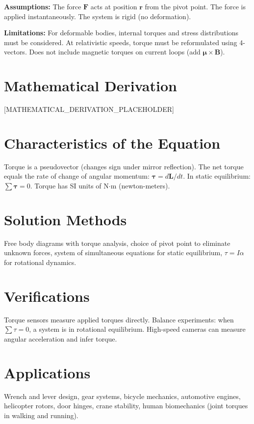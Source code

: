 \documentclass[11pt,openright]{book}
\begin{document}
\textbf{Assumptions:} The force $\mathbf{F}$ acts at position $\mathbf{r}$ from the pivot point. The force is applied instantaneously. The system is rigid (no deformation).


\textbf{Limitations:} For deformable bodies, internal torques and stress distributions must be considered. At relativistic speeds, torque must be reformulated using 4-vectors. Does not include magnetic torques on current loops (add $\boldsymbol{\mu} \times \mathbf{B}$).


\section*{Mathematical Derivation}

[MATHEMATICAL_DERIVATION_PLACEHOLDER]

\section*{Characteristics of the Equation}

Torque is a pseudovector (changes sign under mirror reflection). The net torque equals the rate of change of angular momentum: $\boldsymbol{\tau} = d\mathbf{L}/dt$. In static equilibrium: $\sum \boldsymbol{\tau} = 0$. Torque has SI units of N$\cdot$m (newton-meters).
\section*{Solution Methods}

Free body diagrams with torque analysis, choice of pivot point to eliminate unknown forces, system of simultaneous equations for static equilibrium, $\tau = I\alpha$ for rotational dynamics.
\section*{Verifications}

Torque sensors measure applied torques directly. Balance experiments: when $\sum \tau = 0$, a system is in rotational equilibrium. High-speed cameras can measure angular acceleration and infer torque.
\section*{Applications}

Wrench and lever design, gear systems, bicycle mechanics, automotive engines, helicopter rotors, door hinges, crane stability, human biomechanics (joint torques in walking and running).
\end{document}
